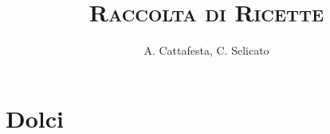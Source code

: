 \documentclass[12pt, oneside]{book}
\newcommand{\parttitle}{}
\let\oldpart\part
\renewcommand{\part}[1]{%
  \def\parttitle{#1}%
  \oldpart{#1}%
}
\begin{document}
\title{\textsc{Raccolta di Ricette}}
\author{A. Cattafesta, C. Selicato}
\date{}

\maketitle
\tableofcontents

\part{Dolci}


\end{document}
